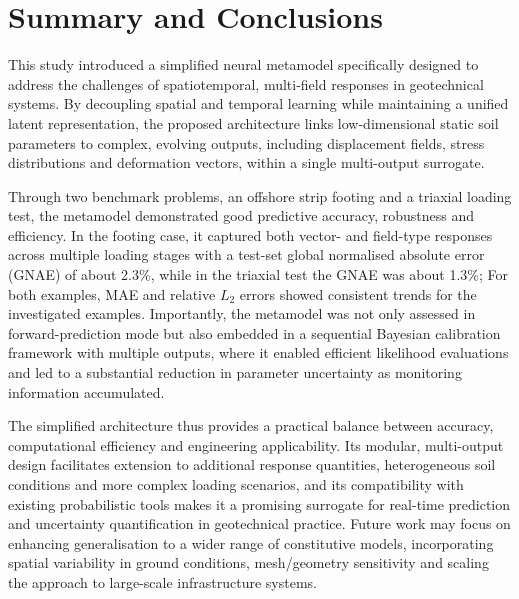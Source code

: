 \section{Summary and Conclusions} \label{sec:conclusion}\noindent
This study introduced a simplified neural metamodel specifically designed to address the challenges of spatiotemporal, multi-field responses in geotechnical systems. By decoupling spatial and temporal learning while maintaining a unified latent representation, the proposed architecture links low-dimensional static soil parameters to complex, evolving outputs, including displacement fields, stress distributions and deformation vectors, within a single multi-output surrogate.

Through two benchmark problems, an offshore strip footing and a triaxial loading test, the metamodel demonstrated good predictive accuracy, robustness and efficiency. In the footing case, it captured both vector- and field-type responses across multiple loading stages with a test-set global normalised absolute error (GNAE) of about 2.3\%, while in the triaxial test the GNAE was about 1.3\%; For both examples, MAE and relative $L_2$ errors showed consistent trends for the investigated examples. Importantly, the metamodel was not only assessed in forward-prediction mode but also embedded in a sequential Bayesian calibration framework with multiple outputs, where it enabled efficient likelihood evaluations and led to a substantial reduction in parameter uncertainty as monitoring information accumulated.

The simplified architecture thus provides a practical balance between accuracy, computational efficiency and engineering applicability. Its modular, multi-output design facilitates extension to additional response quantities, heterogeneous soil conditions and more complex loading scenarios, and its compatibility with existing probabilistic tools makes it a promising surrogate for real-time prediction and uncertainty quantification in geotechnical practice. Future work may focus on enhancing generalisation to a wider range of constitutive models, incorporating spatial variability in ground conditions, mesh/geometry sensitivity and scaling the approach to large-scale infrastructure systems.
